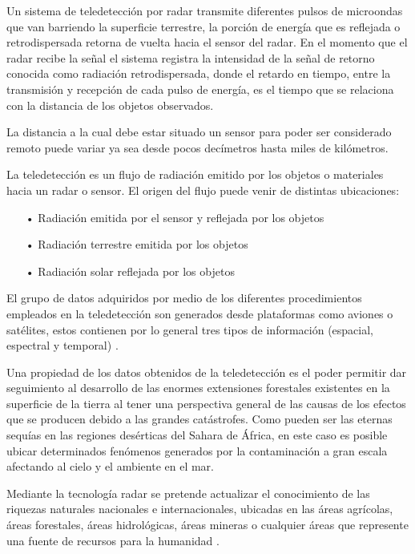 Un sistema de teledetección por radar transmite diferentes pulsos de microondas que van barriendo la superficie terrestre, la porción de energía que es reflejada o retrodispersada retorna de vuelta hacia el sensor del radar. En el momento que el radar recibe la señal el sistema registra la intensidad de la señal de retorno conocida como radiación retrodispersada, donde el retardo en tiempo, entre la transmisión y recepción de cada pulso de energía, es el tiempo que se relaciona con la distancia de los objetos observados.

La distancia a la cual debe estar situado un sensor para poder ser considerado remoto puede variar ya sea desde pocos decímetros hasta miles de kilómetros.

La teledetección es un flujo de radiación emitido por los objetos o materiales hacia un radar o sensor. El origen del flujo puede venir de distintas ubicaciones:

\begin{itemize}
\item[•] Radiación emitida por el sensor y reflejada por los objetos

\item[•] Radiación terrestre emitida por los objetos 

\item[•] Radiación solar reflejada por los objetos 
\end{itemize}

El grupo de datos adquiridos por medio de los diferentes procedimientos empleados en la teledetección son generados desde plataformas como aviones o satélites, estos contienen por lo general tres tipos de información (espacial, espectral y temporal) \cite{SacristanRomero}.

Una propiedad de los datos obtenidos de la teledetección es el poder permitir dar seguimiento al desarrollo de las enormes extensiones forestales existentes en la superficie de la tierra al tener una perspectiva general de las causas de los efectos que se producen debido a las grandes catástrofes. Como pueden ser las eternas sequías en las regiones desérticas del Sahara de África, en este caso es posible ubicar determinados fenómenos generados por la contaminación a gran escala afectando al cielo y el ambiente en el mar.

Mediante la tecnología radar se pretende actualizar el conocimiento de las riquezas naturales nacionales e internacionales, ubicadas en las áreas agrícolas, áreas forestales, áreas hidrológicas, áreas mineras o cualquier áreas que represente una fuente de recursos para la humanidad \cite{Romero2007}.

